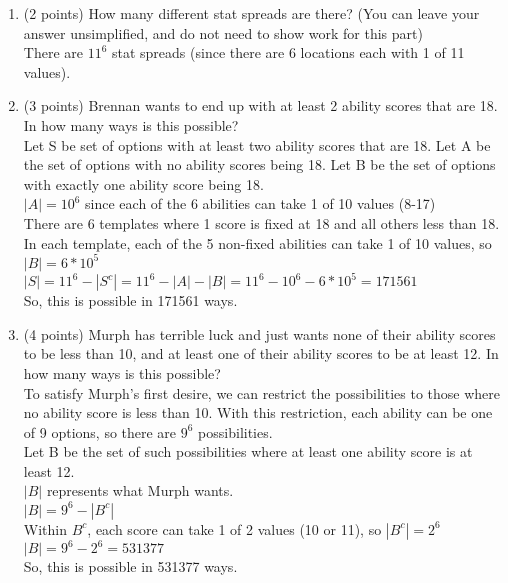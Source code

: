 \documentclass[10pt,letterpaper,unboxed,cm]{article}
\begin{document}
\begin{enumerate}
    \begin{enumerate}
        \item (2 points) How many different stat spreads are there? (You can leave your answer unsimplified, and do not need to show work for this part)
\\
        There are $11^6$ stat spreads (since there are 6 locations each with 1 of 11 values).
        \item (3 points) Brennan wants to end up with at least 2 ability scores that are 18. In how many ways is this possible?\\
        

        Let S be set of options with at least two ability scores that are 18. Let A be the set of options with no ability scores being 18. Let B be the set of options with exactly one ability score being 18.\\
        $|A| = 10^6$ since each of the 6 abilities can take 1 of 10 values (8-17)\\
        There are 6 templates where 1 score is fixed at 18 and all others less than 18. In each template, each of the 5 non-fixed abilities can take 1 of 10 values, so
        $|B| = 6 * 10^5$\\

        $|S| = 11^6 - |S^c| = 11^6 - |A| - |B| = 11^6 - 10^6 - 6*10^5 = 171561$\\
        So, this is possible in 171561 ways.
        
        \item (4 points) Murph has terrible luck and just wants none of their ability scores to be less than 10, and at least one of their ability scores to be at least 12. In how many ways is this possible?\\
        To satisfy Murph's first desire, we can restrict the possibilities to those where no ability score is less than 10. With this restriction, each ability can be one of 9 options, so there are $9^6$ possibilities.\\
        Let B be the set of such possibilities where at least one ability score is at least 12.\\
        $|B|$ represents what Murph wants.\\
        $|B| = 9^6 - |B^c|$\\
        Within $B^c$, each score can take 1 of 2 values (10 or 11), so $|B^c| = 2^6$\\
        $|B| = 9^6 - 2^6 = 531377$\\ So, this is possible in 531377 ways.
        

\end{enumerate}
\end{enumerate}
\end{document}
